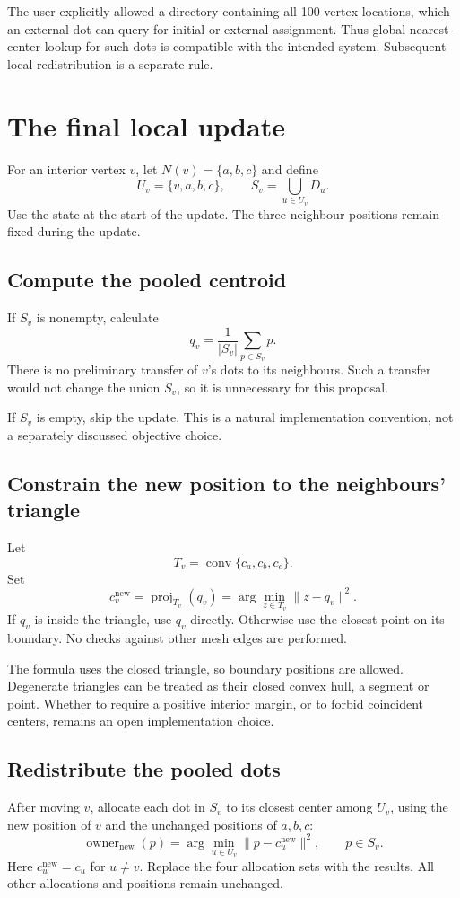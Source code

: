 \documentclass[11pt]{article}
\begin{document}
The user explicitly allowed a directory containing all 100 vertex locations, which an external dot can query for initial or external assignment. Thus global nearest-center lookup for such dots is compatible with the intended system. Subsequent local redistribution is a separate rule.

\section{The final local update}
For an interior vertex $v$, let $N(v)=\{a,b,c\}$ and define
\[
U_v=\{v,a,b,c\},\qquad S_v=\bigcup_{u\in U_v}D_u.
\]
Use the state at the start of the update. The three neighbour positions remain fixed during the update.

\subsection{Compute the pooled centroid}
If $S_v$ is nonempty, calculate
\[
q_v=\frac{1}{|S_v|}\sum_{p\in S_v}p.
\]
There is no preliminary transfer of $v$'s dots to its neighbours. Such a transfer would not change the union $S_v$, so it is unnecessary for this proposal.

If $S_v$ is empty, skip the update. This is a natural implementation convention, not a separately discussed objective choice.

\subsection{Constrain the new position to the neighbours' triangle}
Let
\[
T_v=\operatorname{conv}\{c_a,c_b,c_c\}.
\]
Set
\[
c_v^{\mathrm{new}}=\operatorname{proj}_{T_v}(q_v)
=\arg\min_{z\in T_v}\|z-q_v\|^2.
\]
If $q_v$ is inside the triangle, use $q_v$ directly. Otherwise use the closest point on its boundary. No checks against other mesh edges are performed.

The formula uses the closed triangle, so boundary positions are allowed. Degenerate triangles can be treated as their closed convex hull, a segment or point. Whether to require a positive interior margin, or to forbid coincident centers, remains an open implementation choice.

\subsection{Redistribute the pooled dots}
After moving $v$, allocate each dot in $S_v$ to its closest center among $U_v$, using the new position of $v$ and the unchanged positions of $a,b,c$:
\[
\operatorname{owner}_{\mathrm{new}}(p)
=\arg\min_{u\in U_v}\|p-c_u^{\mathrm{new}}\|^2,
\qquad p\in S_v.
\]
Here $c_u^{\mathrm{new}}=c_u$ for $u\ne v$. Replace the four allocation sets with the results. All other allocations and positions remain unchanged.
\end{document}
